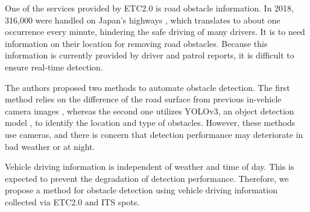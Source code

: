 \documentclass[paper]{ieice}
\begin{document}
%
\par
%
One of the services provided by ETC2.0 is road obstacle information.
%
In 2018, 316,000 were handled on Japan's highways \cite{obstacles}, which translates to about one occurrence every minute, hindering the safe driving of many drivers.
%
It is to need information on their location for removing road obstacles.
%
Because this information is currently provided by driver and patrol reports, it is difficult to ensure real-time detection.
%
\par
%
The authors proposed two methods to automate obstacle detection.
%
The first method relies on the difference of the road surface from previous in-vehicle camera images \cite{hisatoku}, whereas the second one utilizes YOLOv3, an object detection model \cite{wang2021front}, to identify the location and type of obstacles.
%
However, these methods use cameras, and there is concern that detection performance may deteriorate in bad weather or at night.
%
\par
%
Vehicle driving information is independent of weather and time of day.
%
This is expected to prevent the degradation of detection performance.
%
Therefore, we propose a method for obstacle detection using vehicle driving information collected via ETC2.0 and ITS spots.
%
\end{document}
